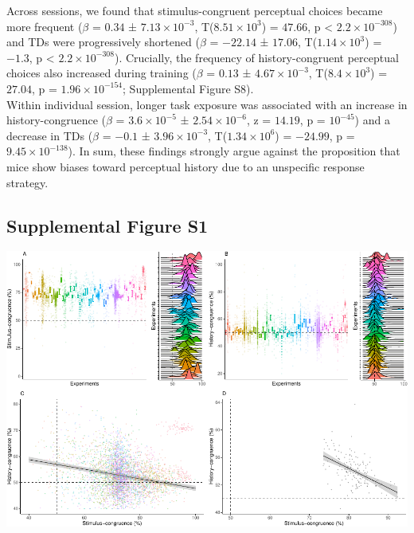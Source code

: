 \documentclass[
]{article}
\begin{document}
Across sessions, we found that stimulus-congruent perceptual choices
became more frequent (\(\beta\) = \(0.34\) ±
\(\ensuremath{7.13\times 10^{-3}}\),
T(\(\ensuremath{8.51\times 10^{3}}\)) = \(47.66\), p < \(\ensuremath{2.2\times 10^{-308}}\)) and TDs
were progressively shortened (\(\beta\) = \(-22.14\) ± \(17.06\),
T(\(\ensuremath{1.14\times 10^{3}}\)) = \(-1.3\), p < \(\ensuremath{2.2\times 10^{-308}}\)). Crucially,
the frequency of history-congruent perceptual choices also increased
during training (\(\beta\) = \(0.13\) ±
\(\ensuremath{4.67\times 10^{-3}}\),
T(\(\ensuremath{8.4\times 10^{3}}\)) = \(27.04\), p =
\(\ensuremath{1.96\times 10^{-154}}\); Supplemental Figure S8).\\
Within individual session, longer task exposure was associated with an
increase in history-congruence (\(\beta\) =
\(\ensuremath{3.6\times 10^{-5}}\) ±
\(\ensuremath{2.54\times 10^{-6}}\), z = \(14.19\), p =
\(\ensuremath{10^{-45}}\)) and a decrease in TDs (\(\beta\) = \(-0.1\) ±
\(\ensuremath{3.96\times 10^{-3}}\),
T(\(\ensuremath{1.34\times 10^{6}}\)) = \(-24.99\), p =
\(\ensuremath{9.45\times 10^{-138}}\)). In sum, these findings strongly
argue against the proposition that mice show biases toward perceptual
history due to an unspecific response strategy.

\newpage

\hypertarget{supplemental-figure-s1}{%
\subsection{Supplemental Figure S1}\label{supplemental-figure-s1}}

\includegraphics{modes_mouse_rev1b_clean_files/figure-latex/Supplemental_Figure_S1-1.pdf}
\end{document}
